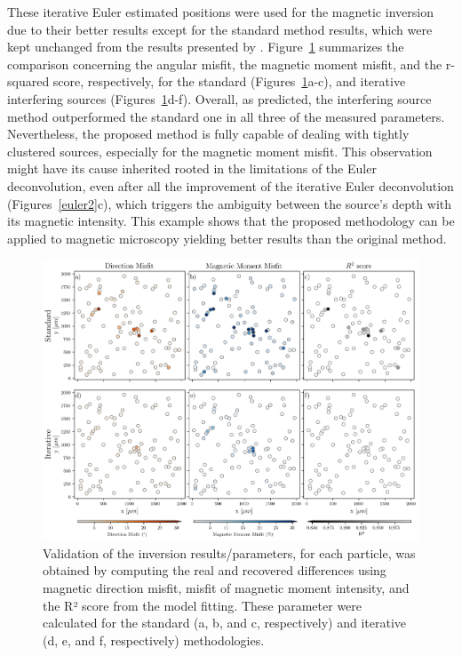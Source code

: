These iterative Euler estimated positions were used for the magnetic inversion due to their better results except for the standard method results, which were kept unchanged from the results presented by \citet{Souza-Junior2023b}. Figure~\ref{inversion2} summarizes the comparison concerning the angular misfit, the magnetic moment misfit, and the r-squared score, respectively, for the standard (Figures~\ref{inversion2}a-c), and iterative interfering sources (Figures~\ref{inversion2}d-f). Overall, as predicted, the interfering source method outperformed the standard one in all three of the measured parameters. Nevertheless, the proposed method is fully capable of dealing with tightly clustered sources, especially for the magnetic moment misfit. This observation might have its cause inherited rooted in the limitations of the Euler deconvolution, even after all the improvement of the iterative Euler deconvolution (Figures~\ref{euler2}c), which triggers the ambiguity between the source's depth with its magnetic intensity. This example shows that the proposed methodology can be applied to magnetic microscopy yielding better results than the original method.


\begin{figure}[tb!]
  \centering
  \includegraphics[width=1\linewidth]{figures/inversion-comparion-2.png}
  \caption{Validation of the inversion results/parameters, for each particle, was obtained by computing the real and recovered differences using magnetic direction misfit, misfit of magnetic moment intensity, and the R² score from the model fitting. These parameter were calculated for the standard (a, b, and c, respectively) and iterative (d, e, and f, respectively) methodologies.}
  \label{inversion2}
\end{figure}

